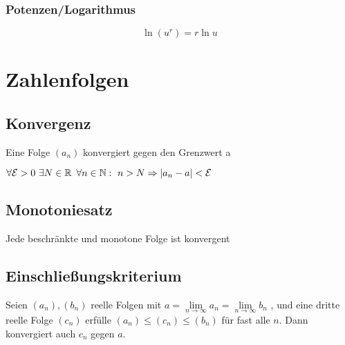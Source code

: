 \documentclass[german]{latex4ei/latex4ei_sheet}
\begin{document}
\begin{sectionbox}
    \subsubsection{Potenzen/Logarithmus}
    \begin{equation*}
    \ln(u^r)=r\ln u
    \end{equation*}
    
    
\end{sectionbox}

\section{Zahlenfolgen}


\begin{sectionbox}
	\subsection{Konvergenz}
	Eine Folge $(a_n)$ konvergiert gegen den Grenzwert a



	$\forall\mathcal{E}>0 \text{ }\exists N \in \operatorname{\mathbb R} \text{ }\forall n \in \operatorname{\mathbb N}:\text{ } n>N \Rightarrow |a_n - a|<\mathcal{E}$





\end{sectionbox}

\begin{sectionbox}
	\subsection{Monotoniesatz}

	Jede beschränkte und monotone Folge ist konvergent

\end{sectionbox}



\begin{sectionbox}
	\subsection{Einschließungskriterium}

Seien $(a_n), (b_n)$  reelle Folgen mit $a = \lim\limits_{n \to \infty}  a_n =  \lim\limits_{n \to \infty}b_n $ , und eine dritte reelle Folge $(c_n)$ erfülle  $(a_n) \le (c_n) \le (b_n)$ für fast alle $n$. Dann konvergiert auch \(c_n\)  gegen $a$.


\end{sectionbox}
\end{document}
